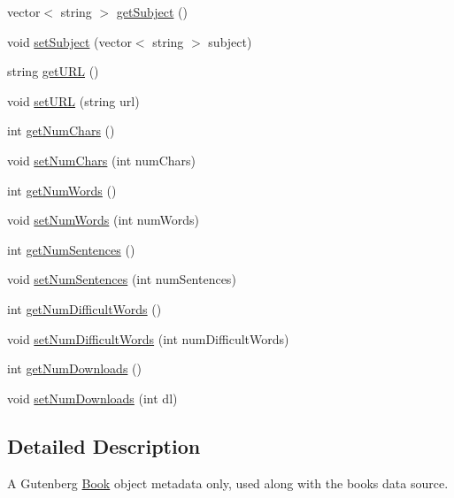 \begin{DoxyCompactItemize}
\item 
vector$<$ string $>$ \mbox{\hyperlink{classbridges_1_1_gutenberg_book_aa005000e827d8b3dd208ab269906f8ed}{get\+Subject}} ()
\item 
void \mbox{\hyperlink{classbridges_1_1_gutenberg_book_aa640bef3156b13c8ca510e0a280b1c5f}{set\+Subject}} (vector$<$ string $>$ subject)
\item 
string \mbox{\hyperlink{classbridges_1_1_gutenberg_book_a1456d456f75c689b06d80b7e2d0f46e3}{get\+U\+RL}} ()
\item 
void \mbox{\hyperlink{classbridges_1_1_gutenberg_book_a4a5fa52c405170b57535cd0fcde5e3cf}{set\+U\+RL}} (string url)
\item 
int \mbox{\hyperlink{classbridges_1_1_gutenberg_book_aa86b5c97b78ef0f745723a7245ee05f2}{get\+Num\+Chars}} ()
\item 
void \mbox{\hyperlink{classbridges_1_1_gutenberg_book_a65cb7af6360e56a684e0606593846780}{set\+Num\+Chars}} (int num\+Chars)
\item 
int \mbox{\hyperlink{classbridges_1_1_gutenberg_book_aadb4dc37374a7b3be6b7b4def4726d5b}{get\+Num\+Words}} ()
\item 
void \mbox{\hyperlink{classbridges_1_1_gutenberg_book_a34dafee1fb976f1da102d40f33a08ecf}{set\+Num\+Words}} (int num\+Words)
\item 
int \mbox{\hyperlink{classbridges_1_1_gutenberg_book_a059066390328e09949ea5fdb456a5c43}{get\+Num\+Sentences}} ()
\item 
void \mbox{\hyperlink{classbridges_1_1_gutenberg_book_a368e71eaea48375104f172e0ae17527d}{set\+Num\+Sentences}} (int num\+Sentences)
\item 
int \mbox{\hyperlink{classbridges_1_1_gutenberg_book_a26f18a0274a7cebd495f3e438e9a037f}{get\+Num\+Difficult\+Words}} ()
\item 
void \mbox{\hyperlink{classbridges_1_1_gutenberg_book_a4397cd3b9fd6113a1e72eb7671dd9d87}{set\+Num\+Difficult\+Words}} (int num\+Difficult\+Words)
\item 
int \mbox{\hyperlink{classbridges_1_1_gutenberg_book_a9d11f90ed3928c075534f3712e00f011}{get\+Num\+Downloads}} ()
\item 
void \mbox{\hyperlink{classbridges_1_1_gutenberg_book_a6846dba9a5a78f360a0483b8685d79c1}{set\+Num\+Downloads}} (int dl)
\end{DoxyCompactItemize}


\subsection{Detailed Description}
A Gutenberg \mbox{\hyperlink{classbridges_1_1_book}{Book}} object metadata only, used along with the books data source. 


